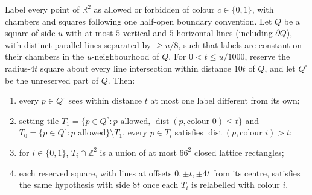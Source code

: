 \begin{lemma}
    \label{lem:peps_cell_active_square}
    \leanok
    Label every point of $\mathbb R^2$ as allowed or forbidden of colour $c\in\{0,1\}$,
    with chambers and squares following one half-open boundary convention.
    Let $Q$ be a square of side $u$ with at most $5$ vertical and $5$ horizontal lines
    (including $\partial Q$), with distinct parallel lines separated by $\ge u/8$,
    such that labels are constant on their chambers in the $u$-neighbourhood of $Q$.
    For $0<t\le u/1000$, reserve the radius-$4t$ square about every line intersection
    within distance $10t$ of $Q$, and let $Q^\circ$ be the unreserved part of $Q$. Then:
    \begin{enumerate}
        \item every $p\in Q^\circ$ sees within distance $t$ at most one label different from its own;
        \item setting tile $T_1=\{p\in Q^\circ:p\text{ allowed},\,\operatorname{dist}(p,\text{colour }0)\le t\}$
              and $T_0=\{p\in Q^\circ:p\text{ allowed}\}\setminus T_1$, every
              $p\in T_i$ satisfies $\operatorname{dist}(p,\text{colour }i)>t$;
        \item for $i\in\{0,1\}$, $T_i\cap\mathbb Z^2$ is a union of at most $66^2$
              closed lattice rectangles;
        \item each reserved square, with lines at offsets $0,\pm t,\pm4t$ from its centre,
              satisfies the same hypothesis with side $8t$ once each $T_i$ is relabelled with colour $i$.
    \end{enumerate}
\end{lemma}
